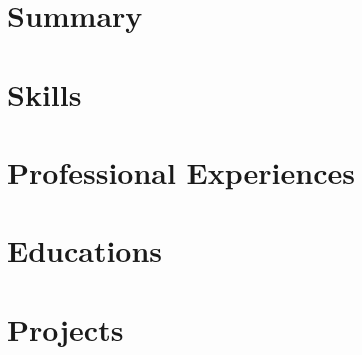 \documentclass[11pt,letterpaper]{article}
\begin{document}
    

    \section{Summary}\label{sec:summary}
    

    \section{Skills}\label{sec:skills}
    

    \section{Professional Experiences}\label{sec:professional-experiences}
    

    \section{Educations}\label{sec:educations}
    

    \section{Projects}\label{sec:projects}
    
\end{document}
